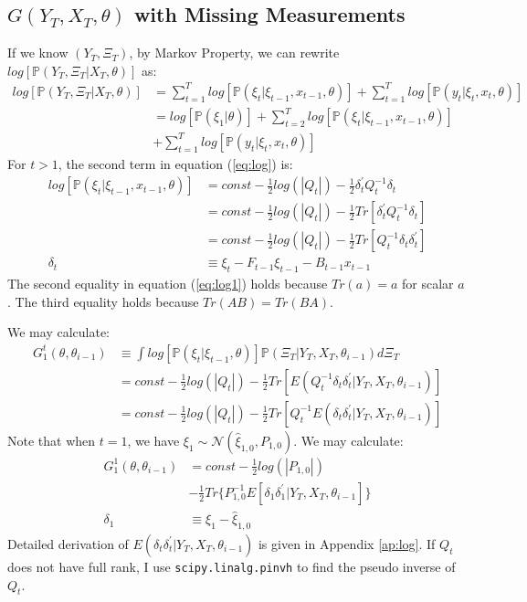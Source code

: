\documentclass[12pt]{article}
\numberwithin{equation}{section}
\begin{document}
\subsection{$G(Y_T,X_T,\theta)$ with Missing Measurements} \label{subsec:G}
If we know $(Y_T,\Xi_T)$, by Markov Property, we can rewrite $log[\mathbb{P}(Y_T,\Xi_T|X_T,\theta)]$ as:
\begin{align}
    log[\mathbb{P}(Y_T,\Xi_T|X_T,\theta)] &= \sum_{t=1}^{T}log[\mathbb{P}(\xi_t|\xi_{t-1},x_{t-1},\theta)] 
    + \sum_{t=1}^{T}log[\mathbb{P}(y_t|\xi_t,x_t,\theta)] \nonumber \\
    &= log[\mathbb{P}(\xi_1|\theta)] + \sum_{t=2}^{T}log[\mathbb{P}(\xi_t|\xi_{t-1},x_{t-1},\theta)] \nonumber \\ 
    &+ \sum_{t=1}^{T}log[\mathbb{P}(y_t|\xi_t,x_t,\theta)]\label{eq:log}
\end{align}
For $t>1$, the second term in equation (\ref{eq:log}) is:
\begin{align}
    log[\mathbb{P}(\xi_t|\xi_{t-1},x_{t-1},\theta)] &= const-\frac{1}{2}log(|Q_t|) 
    -\frac{1}{2}\delta_t^{'}Q_t^{-1}\delta_t \nonumber \\
    &= const-\frac{1}{2}log(|Q_t|) 
    -\frac{1}{2}Tr[\delta_t^{'}Q_t^{-1}\delta_t] \nonumber \\
    &= const-\frac{1}{2}log(|Q_t|) 
    -\frac{1}{2}Tr[Q_t^{-1}\delta_t\delta_t^{'}] \label{eq:log1} \\
    \delta_t &\equiv \xi_t - F_{t-1}\xi_{t-1}-B_{t-1}x_{t-1} \nonumber
\end{align}
The second equality in equation (\ref{eq:log1}) holds because $Tr(a)=a$ for scalar $a$. The third equality holds because $Tr(AB)=Tr(BA)$. 

We may calculate:
\begin{align}
    G_1^{t}(\theta,\theta_{i-1}) &\equiv \int log[\mathbb{P}(\xi_t|\xi_{t-1},\theta)]\mathbb{P}(\Xi_T|Y_T,X_T,\theta_{i-1})d\Xi_T \nonumber \\
    &= const -\frac{1}{2}log(|Q_t|)-\frac{1}{2}Tr[E(Q_t^{-1}\delta_t\delta_t^{'}|Y_T,X_T,\theta_{i-1})] \nonumber \\
    &= const - \frac{1}{2}log(|Q_t|) - \frac{1}{2}Tr[Q_t^{-1}E(\delta_t\delta_t^{'}|Y_T,X_T,\theta_{i-1})] \label{eq:log1_trace}
\end{align}
Note that when $t=1$, we have $\xi_1\sim\mathcal{N}(\hat{\xi}_{1,0}, P_{1,0})$. We may calculate:
\begin{align}
    G_1^1(\theta,\theta_{i-1}) &= const - \frac{1}{2}log(|P_{1,0}|) \nonumber \\
    &- \frac{1}{2}Tr\{P_{1,0}^{-1}E[\delta_1\delta_1^{'}|Y_T, X_T, \theta_{i-1}]\} \nonumber \\
    \delta_1 &\equiv \xi_1 - \hat{\xi}_{1,0} \nonumber
\end{align}
Detailed derivation of $E(\delta_t\delta_t^{'}|Y_T,X_T,\theta_{i-1})$ is given in Appendix \ref{ap:log}. If $Q_t$ does not have full rank, I use \texttt{scipy.linalg.pinvh} to find the pseudo inverse of $Q_t$. 
\end{document}
